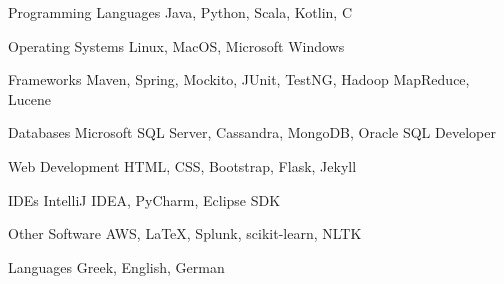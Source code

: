

\begin{cvskills}

  \cvskill
    {Programming Languages} %
    {Java, Python, Scala, Kotlin, C} %

  \cvskill
    {Operating Systems} %
    {Linux, MacOS, Microsoft Windows} %
    
  \cvskill
    {Frameworks} %
    {Maven, Spring, Mockito, JUnit, TestNG, Hadoop MapReduce, Lucene} %

  \cvskill
    {Databases} %
    {Microsoft SQL Server, Cassandra, MongoDB, Oracle SQL Developer} %

  \cvskill
    {Web Development} %
    {HTML, CSS, Bootstrap, Flask, Jekyll} %

  \cvskill
    {IDEs} %
    {IntelliJ IDEA, PyCharm, Eclipse SDK} %

  \cvskill
    {Other Software} %
    {AWS, LaTeX, Splunk, scikit-learn, NLTK} %

  \cvskill
    {Languages} %
    {Greek, English, German} %

\end{cvskills}

